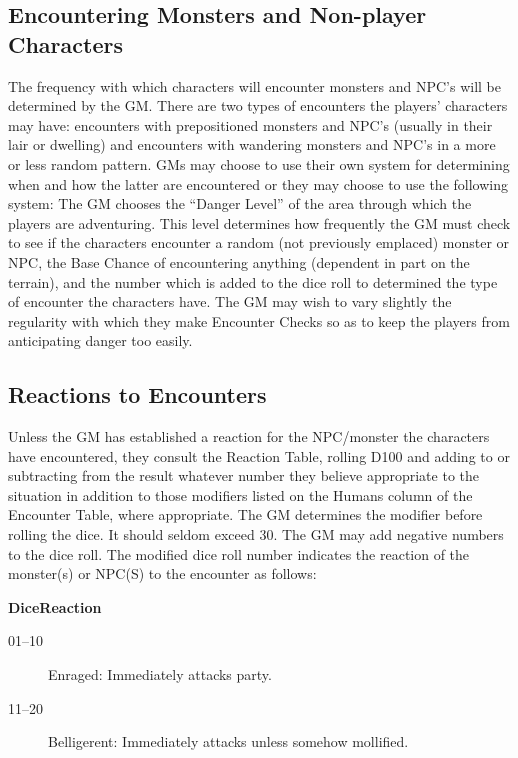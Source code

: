\begin{multicols}{3}
\subsection{Encountering Monsters and Non-player Characters}

The frequency with which characters will encounter monsters and NPC's
will be determined by the GM.  There are two types of encounters the
players' characters may have: encounters with prepositioned monsters
and NPC's (usually in their lair or dwelling) and encounters with
wandering monsters and NPC's in a more or less random pattern.  GMs
may choose to use their own system for determining when and how the
latter are encountered or they may choose to use the following system:
The GM chooses the ``Danger Level'' of the area through which the
players are adventuring.  This level determines how frequently the GM
must check to see if the characters encounter a random (not previously
emplaced) monster or NPC, the Base Chance of encountering anything
(dependent in part on the terrain), and the number which is added to
the dice roll to determined the type of encounter the characters have.
The GM may wish to vary slightly the regularity with which they make
Encounter Checks so as to keep the players from anticipating danger
too easily.

\subsection{Reactions to Encounters}

Unless the GM has established a reaction for the NPC/monster the
characters have encountered, they consult the Reaction Table, rolling
D100 and adding to or subtracting from the result whatever number they
believe appropriate to the situation in addition to those modifiers
listed on the Humans column of the Encounter Table, where appropriate.
The GM determines the modifier before rolling the dice.  It should
seldom exceed 30.  The GM may add negative numbers to the dice roll.
The modified dice roll number indicates the reaction of the monster(s)
or NPC(S) to the encounter as follows:

\textbf{Dice}\hspace{5.0em}\textbf{Reaction}
\begin{description}

\item[01--10]
Enraged: Immediately attacks party.

\item[11--20]
Belligerent: Immediately attacks unless somehow mollified.


\end{description}
\end{multicols}

